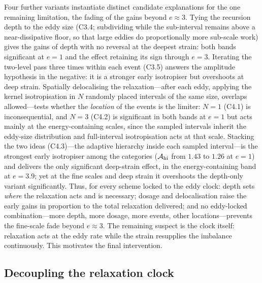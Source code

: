 \documentclass[lineno]{JFM-FLM_Au}
\begin{document}
Four further variants instantiate distinct candidate explanations for the one remaining limitation, the fading of the gains beyond $e\approx3$. Tying
the recursion depth to the eddy size (C3.4; subdividing while the sub-interval
remains above a near-dissipative floor, so that large eddies do
proportionally more sub-scale work) gives the gains of depth with no
reversal at the deepest strain: both bands significant at $e=1$ and the
effect retaining its sign through $e=3$. Iterating the two-level pass three times within each event (C3.5) answers the amplitude hypothesis in the
negative: it is a stronger early isotropiser but overshoots at deep
strain. Spatially delocalising the relaxation---after each eddy, applying the
kernel isotropisation in $N$ randomly placed intervals of the same size,
overlaps allowed---tests whether the \emph{location} of the events is
the limiter: $N=1$ (C4.1) is inconsequential, and $N=3$ (C4.2) is significant in both bands at $e=1$ but acts mainly at the energy-containing scales, since the sampled
intervals inherit the eddy-size distribution and full-interval
isotropisation acts at that scale. Stacking the two ideas (C4.3)---the adaptive hierarchy inside each sampled interval---is the strongest early isotropiser among the categories ($\mathcal A_{\rm hi}$ from $1.43$ to $1.26$
at $e=1$) and delivers the only significant deep-strain effect, in the
energy-containing band at $e=3.9$; yet at the fine scales and deep
strain it overshoots the depth-only variant significantly. Thus, for every scheme locked to the eddy clock: depth sets
\emph{where} the relaxation acts and is necessary; dosage and
delocalisation raise the early gains in proportion to the total
relaxation delivered; and no eddy-locked combination---more depth, more
dosage, more events, other locations---prevents the fine-scale fade
beyond $e\approx3$. The remaining suspect is the clock itself:
relaxation acts at the eddy rate while the strain resupplies the
imbalance continuously. This motivates the final intervention.

\subsection{Decoupling the relaxation clock}\label{sec:clock}
\end{document}
